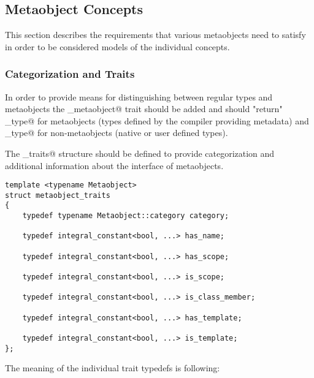 \subsection{Metaobject Concepts}

This section describes the requirements that various metaobjects
need to satisfy in order to be considered models of the individual
concepts.

\subsubsection{Categorization and Traits}

In order to provide means for distinguishing between regular types
and metaobjects the \verb@is_metaobject@ trait should be added
and should "return" \verb@true_type@ for metaobjects (types defined
by the compiler providing metadata) and \verb@false_type@
for non-metaobjects (native or user defined types).

The \verb@metaobject_traits@ structure should be defined to provide
categorization and additional information about the interface of metaobjects.

\begin{lstlisting}
template <typename Metaobject>
struct metaobject_traits
{
	typedef typename Metaobject::category category;

	typedef integral_constant<bool, ...> has_name;

	typedef integral_constant<bool, ...> has_scope;

	typedef integral_constant<bool, ...> is_scope;

	typedef integral_constant<bool, ...> is_class_member;

	typedef integral_constant<bool, ...> has_template;

	typedef integral_constant<bool, ...> is_template;
};
\end{lstlisting}

The meaning of the individual trait typedefs is following:

